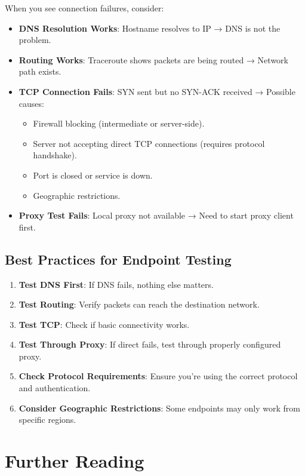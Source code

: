 When you see connection failures, consider:

\begin{itemize}
    \item \textbf{DNS Resolution Works}: Hostname resolves to IP → DNS is not the problem.
    \item \textbf{Routing Works}: Traceroute shows packets are being routed → Network path exists.
    \item \textbf{TCP Connection Fails}: SYN sent but no SYN-ACK received → Possible causes:
    \begin{itemize}
        \item Firewall blocking (intermediate or server-side).
        \item Server not accepting direct TCP connections (requires protocol handshake).
        \item Port is closed or service is down.
        \item Geographic restrictions.
    \end{itemize}
    \item \textbf{Proxy Test Fails}: Local proxy not available → Need to start proxy client first.
\end{itemize}

\subsection{Best Practices for Endpoint Testing}

\begin{enumerate}
    \item \textbf{Test DNS First}: If DNS fails, nothing else matters.
    \item \textbf{Test Routing}: Verify packets can reach the destination network.
    \item \textbf{Test TCP}: Check if basic connectivity works.
    \item \textbf{Test Through Proxy}: If direct fails, test through properly configured proxy.
    \item \textbf{Check Protocol Requirements}: Ensure you're using the correct protocol and authentication.
    \item \textbf{Consider Geographic Restrictions}: Some endpoints may only work from specific regions.
\end{enumerate}

\section{Further Reading}


